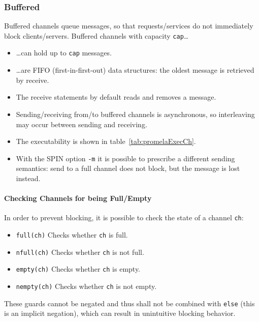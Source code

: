 \documentclass[a4paper, 11pt, accentcolor = tud3b]{tudreport}
\newcommand{\inlinePromela}[1]{\lstinline[language = PROMELA]|#1|}
\begin{document}
				\subsubsection{Buffered}
					Buffered channels queue messages, so that requests/services do not immediately block clients/servers. Buffered channels with capacity \texttt{cap}\dots
					\begin{itemize}
						\item \dots can hold up to \texttt{cap} messages.
						\item \dots are FIFO (first-in-first-out) data structures: the oldest message is retrieved by receive.
						\item The receive statements by default reads and removes a message.
						\item Sending/receiving from/to buffered channels is asynchronous, so interleaving may occur between sending and receiving.
						\item The executability is shown in table~\ref{tab:promelaExecCh}.
						\item With the SPIN option \texttt{-m} it is possible to prescribe a different sending semantics: send to a full channel does not block, but the message is lost instead.
					\end{itemize}
				
					\paragraph{Checking Channels for being Full/Empty}
						In order to prevent blocking, it is possible to check the state of a channel \inlinePromela{ch}:
						\begin{itemize}
							\item \inlinePromela{full(ch)}   \tabto{2cm} Checks whether \inlinePromela{ch} is full.
							\item \inlinePromela{nfull(ch)}  \tabto{2cm} Checks whether \inlinePromela{ch} is not full.
							\item \inlinePromela{empty(ch)}  \tabto{2cm} Checks whether \inlinePromela{ch} is empty.
							\item \inlinePromela{nempty(ch)} \tabto{2cm} Checks whether \inlinePromela{ch} is not empty.
						\end{itemize}
						
						These guards cannot be negated and thus shall not be combined with \inlinePromela{else} (this is an implicit negation), which can result in unintuitive blocking behavior.
					
\end{document}
